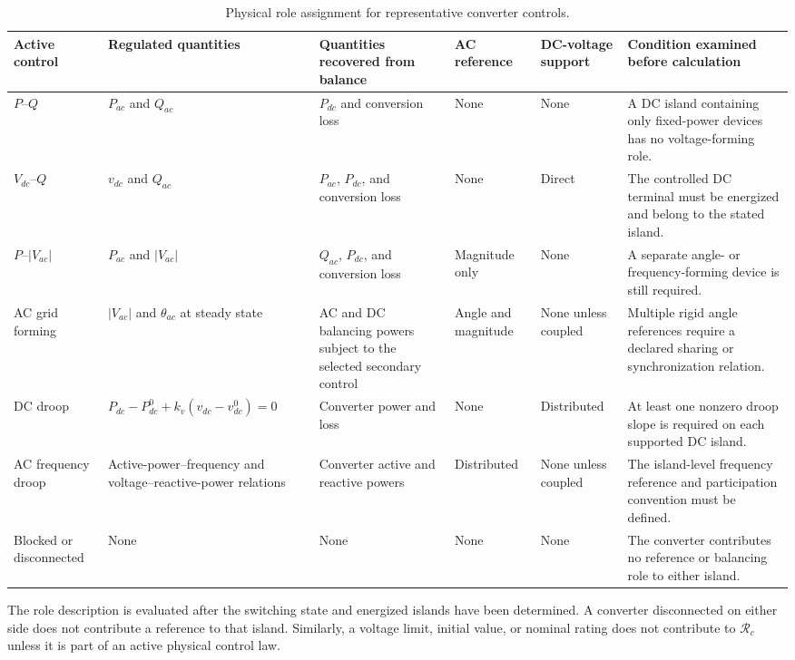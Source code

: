 \documentclass[final,5p,times,twocolumn]{elsarticle}
\begin{document}
\begin{table}[t]
\centering
\caption{Physical role assignment for representative converter controls.}
\label{tab:converter-roles}
\footnotesize
\begin{tabularx}{\textwidth}{@{}p{}p{}p{}p{}p{}X@{}}
\toprule
Active control & Regulated quantities & Quantities recovered from balance & AC reference & DC-voltage support & Condition examined before calculation \\
\midrule
$P$--$Q$ & $P_{ac}$ and $Q_{ac}$ & $P_{dc}$ and conversion loss & None & None & A DC island containing only fixed-power devices has no voltage-forming role. \\
$V_{dc}$--$Q$ & $v_{dc}$ and $Q_{ac}$ & $P_{ac}$, $P_{dc}$, and conversion loss & None & Direct & The controlled DC terminal must be energized and belong to the stated island. \\
$P$--$|V_{ac}|$ & $P_{ac}$ and $|V_{ac}|$ & $Q_{ac}$, $P_{dc}$, and conversion loss & Magnitude only & None & A separate angle- or frequency-forming device is still required. \\
AC grid forming & $|V_{ac}|$ and $\theta_{ac}$ at steady state & AC and DC balancing powers subject to the selected secondary control & Angle and magnitude & None unless coupled & Multiple rigid angle references require a declared sharing or synchronization relation. \\
DC droop & $P_{dc}-P_{dc}^{0}+k_v(v_{dc}-v_{dc}^{0})=0$ & Converter power and loss & None & Distributed & At least one nonzero droop slope is required on each supported DC island. \\
AC frequency droop & Active-power--frequency and voltage--reactive-power relations & Converter active and reactive powers & Distributed & None unless coupled & The island-level frequency reference and participation convention must be defined. \\
Blocked or disconnected & None & None & None & None & The converter contributes no reference or balancing role to either island. \\
\bottomrule
\end{tabularx}
\end{table}

The role description is evaluated after the switching state and energized
islands have been determined. A converter disconnected on either side does not
contribute a reference to that island. Similarly, a voltage limit, initial
value, or nominal rating does not contribute to $\mathcal R_c$ unless it is part
of an active physical control law.
\end{document}
